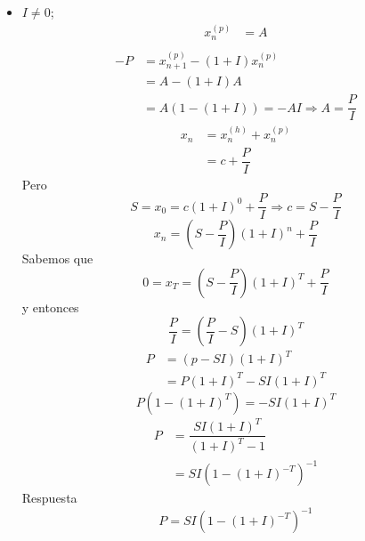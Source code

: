 \begin{ejercicio}
\begin{itemize}
        \item $I \neq 0$;
        \begin{align*}
            x_n^{(p)} &= A \\
        \end{align*}
        \begin{align*}
            -P &= x_{n+1}^{(p)} - (1+I)x_n^{(p)} \\
                      &= A-(1+I)A \\
                      &= A (1-(1+I)) = -AI \Longrightarrow A = \dfrac{P}{I}
        \end{align*}
        \begin{align*}
            x_n &= x_n^{(h)} + x_n^{(p)} \\
                &= c + \dfrac{P}{I}
        \end{align*}
        Pero
        \begin{equation*}
            S = x_0 = c{(1+I)}^0 + \dfrac{P}{I} \Longrightarrow c = S - \dfrac{P}{I}
        \end{equation*}
        \begin{equation*}
            x_n = \left(S - \dfrac{P}{I}\right){(1+I)}^n + \dfrac{P}{I}
        \end{equation*}
        Sabemos que
        \begin{equation*}
            0 = x_T = \left(S-\dfrac{P}{I}\right){(1+I)}^T + \dfrac{P}{I}
        \end{equation*}
        y entonces
        \begin{equation*}
            \dfrac{P}{I} = \left(\dfrac{P}{I} - S\right){(1+I)}^T
        \end{equation*}
        \begin{align*}
            P &= (p-SI){(1+I)}^T \\
              &= P{{(1+I)}}^T - SI{{(1+I)}}^T
        \end{align*}
        \begin{equation*}
            P(1-{(1+I)}^T) = -SI{(1+I)}^T
        \end{equation*}
        \begin{align*}
            P &= \dfrac{SI{(1+I)}^T}{{(1+I)}^T-1} \\
              &= SI{(1-{(1+I)}^{-T})}^{-1}
        \end{align*}
        Respuesta
        \begin{equation*}
              P = SI{(1-{(1+I)}^{-T})}^{-1}
        \end{equation*}
    \end{itemize}

\end{ejercicio}

